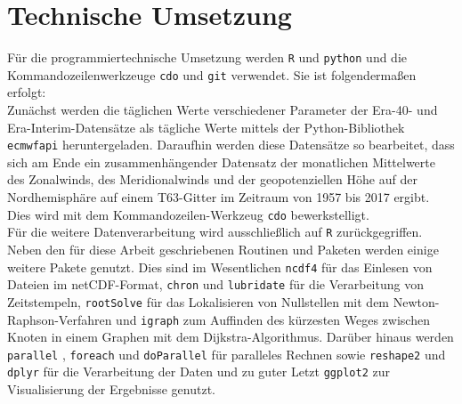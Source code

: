 \section{Technische Umsetzung}
Für die programmiertechnische Umsetzung werden \texttt{R} und \texttt{python} und die Kommando\-zeilen\-werkzeuge \texttt{cdo} und \texttt{git} verwendet. Sie ist folgendermaßen erfolgt: 
\\
Zunächst werden die täglichen Werte verschiedener Parameter der Era-40- und Era-Interim-Datensätze als tägliche Werte mittels der Python-Bibliothek \texttt{ecmwfapi} \citep{ecmwfapi} heruntergeladen. Daraufhin werden diese Datensätze so bearbeitet, dass sich am Ende ein zusammenhängender Datensatz der monatlichen Mittelwerte des Zonalwinds, des Meridionalwinds und der geopotenziellen Höhe auf der Nordhemisphäre auf einem T63-Gitter im Zeitraum von 1957 bis 2017 ergibt. Dies wird mit dem Kommandozeilen-Werkzeug \texttt{cdo} \citep{cdo-2015} bewerkstelligt.
\\
Für die weitere Datenverarbeitung wird ausschließlich auf \texttt{R} \citep{R-2017} zurückgegriffen. Neben den für diese Arbeit geschriebenen Routinen und Paketen werden einige weitere Pakete genutzt. Dies sind im Wesentlichen \texttt{ncdf4} \citep{ncdf4-2017} für das Einlesen von Dateien im netCDF-Format, \texttt{chron} \citep{chron-2017} und \texttt{lubridate} \citep{lubridate-2011} für die Verarbeitung von Zeitstempeln, \texttt{rootSolve} \citep{rootSolve-2009} für das Lokalisieren von Nullstellen mit dem Newton-Raphson-Verfahren und \texttt{igraph} \citep{igraph-2006} zum Auffinden des kürzesten Weges zwischen Knoten in einem Graphen mit dem Dijkstra-Algorithmus.
Darüber hinaus werden \texttt{parallel} \citep{R-2017}, \texttt{foreach} \citep{foreach-2015} und \texttt{doParallel} \citep{doParallel-2015} für paralleles Rechnen sowie \texttt{reshape2} \citep{reshape2-2007} und \texttt{dplyr} \citep{dplyr} für die Verarbeitung der Daten und zu guter Letzt \texttt{ggplot2} \citep{ggplot2-2009} zur Visualisierung der Ergebnisse genutzt.

